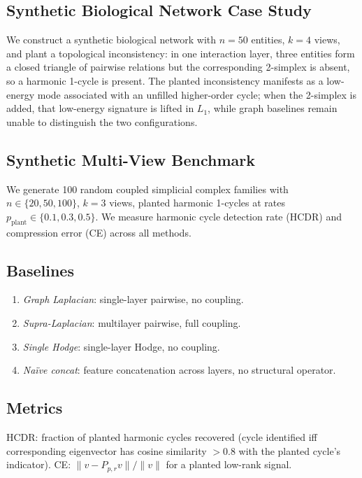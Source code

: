 \documentclass[11pt]{article}
\theoremstyle{definition}
\theoremstyle{remark}
\newcommand{\Pp}{P_{p,r}}
\begin{document}
\subsection{Synthetic Biological Network Case Study}

We construct a synthetic biological network with $n = 50$ entities, $k = 4$ views, and plant a topological inconsistency: in one interaction layer, three entities form a closed triangle of pairwise relations but the corresponding 2-simplex is absent, so a harmonic 1-cycle is present. The planted inconsistency manifests as a low-energy mode associated with an unfilled higher-order cycle; when the 2-simplex is added, that low-energy signature is lifted in $L_1$, while graph baselines remain unable to distinguish the two configurations.

\subsection{Synthetic Multi-View Benchmark}

We generate 100 random coupled simplicial complex families with
$n\in\{20,50,100\}$, $k=3$ views, planted harmonic 1-cycles at rates
$p_{\mathrm{plant}}\in\{0.1, 0.3, 0.5\}$. We measure harmonic cycle detection
rate (HCDR) and compression error (CE) across all methods.

\subsection{Baselines}

\begin{enumerate}
\item \textit{Graph Laplacian}: single-layer pairwise, no coupling.
\item \textit{Supra-Laplacian}: multilayer pairwise, full coupling.
\item \textit{Single Hodge}: single-layer Hodge, no coupling.
\item \textit{Na\"ive concat}: feature concatenation across layers, no
      structural operator.
\end{enumerate}

\subsection{Metrics}

HCDR: fraction of planted harmonic cycles recovered (cycle identified iff
corresponding eigenvector has cosine similarity $>0.8$ with the planted
cycle's indicator). CE: $\|v-\Pp v\|/\|v\|$ for a planted low-rank signal.
\end{document}
